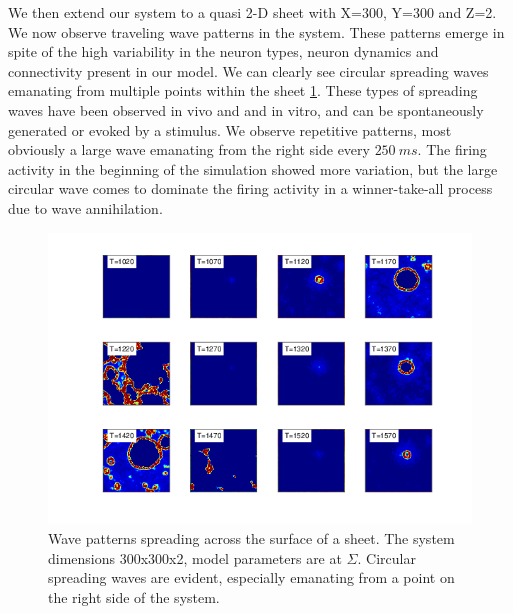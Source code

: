 \documentclass[12pt]{article}
\begin{document}
\FloatBarrier

We then extend our system to a quasi 2-D sheet with X=300, Y=300 and Z=2.
We now observe traveling wave patterns in the system.
These patterns emerge in spite of the high variability in the neuron types, neuron dynamics and connectivity present in our model.
We can clearly see  circular spreading waves emanating from multiple points within the sheet \ref{fig:2D_waves}.
These types of spreading waves have been observed in vivo\parencite{Mohajerani2013} and and in vitro, and can be spontaneously generated or evoked by a stimulus\parencite{Stroh2013}.
We observe repetitive patterns, most obviously a large wave emanating from the right side every $250~ms$.
The firing activity in the beginning of the simulation showed more variation, but the large circular wave comes to dominate the firing activity 
in a winner-take-all process due to wave annihilation.
\begin{figure}[!htb]
 \caption{ Wave patterns spreading across the surface of a sheet. 
           The system dimensions 300x300x2, model parameters are at $\Sigma$. 
           Circular spreading waves are evident, especially emanating from a point on the right side of the system.}
 \label{fig:2D_waves}
 \centering
   \includegraphics[width=\textwidth]{fig/2DSpreadingWaves_Sigma}
\end{figure}

\FloatBarrier
\end{document}
